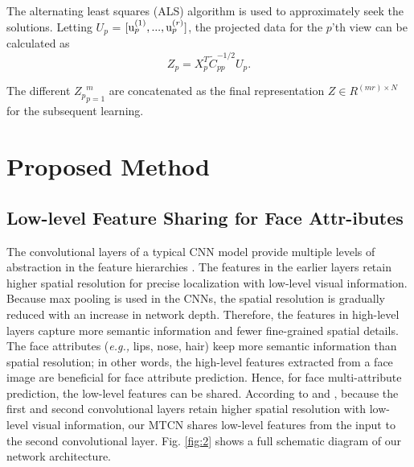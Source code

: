 \documentclass{sig-alternate-05-2015}
\begin{document}
The alternating least squares (ALS) algorithm is used to approximately seek the solutions. Letting $U_p$ = $[{\rm u}_p^{(1)}, ..., {\rm u}_p^{(r)}]$, the projected data for the $p$'th view can be calculated as
\begin{equation}\label{}
{Z_p} = X_p^T\widetilde{C}_{pp}^{ - 1/2}{U_p}.
\end{equation}

The different ${Z_p}_{p=1}^m$ are concatenated as the final representation $Z \in {R^{(mr) \times N}}$ for the subsequent learning.
\section{Proposed Method}



%




\subsection{Low-level Feature Sharing for Face Attr-ibutes}

The convolutional layers of a typical CNN model provide multiple levels of abstraction in the feature hierarchies \cite{ma2015hierarchical}. The features in the earlier layers retain higher spatial resolution for precise localization with low-level visual information. Because max pooling is used in the CNNs, the spatial resolution is gradually reduced with an increase in network depth. Therefore, the features in high-level layers capture more semantic information and fewer fine-grained spatial details. The face attributes ({\em e.g.,} lips, nose, hair) keep more semantic information than spatial resolution; in other words, the high-level features extracted from a face image are beneficial for face attribute prediction. Hence, for face multi-attribute prediction, the low-level features can be shared. According to \cite{ma2015hierarchical} and \cite{hand2017attributes}, because the first and second convolutional layers retain higher spatial resolution with low-level visual information, our MTCN shares low-level features from the input to the second convolutional layer. Fig. \ref{fig:2} shows a full schematic diagram of our network architecture.
\end{document}
